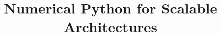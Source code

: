 \documentclass[10pt]{article}
\begin{document}
%
\title{Numerical Python for Scalable Architectures}
\author{}



% 


\maketitle
\end{document}
